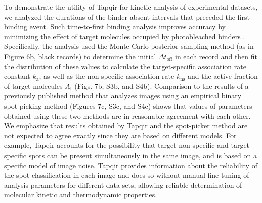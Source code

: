 To demonstrate the utility of Tapqir for kinetic analysis of experimental datasets, we analyzed the durations of the binder-absent intervals that preceded the first binding event.  Such time-to-first binding analysis improves accuracy by minimizing the effect of target molecules occupied by photobleached binders \cite{Friedman2006-kb}.  Specifically, the analysis used the Monte Carlo posterior sampling method (as in Figure 6b, black records) to determine the initial  $\Delta t_\mathrm{off}$ in each record and then fit the distribution of these values to calculate the target-specific association rate constant $k_\mathrm{a}$, as well as the non-specific association rate $k_\mathrm{ns}$ and the active fraction of target molecules $A_\mathrm{f}$ (Figs. 7b, S3b, and S4b). Comparison to the results of a previously published method that analyzes images using an empirical binary spot-picking method \cite{Friedman2006-kb} (Figures 7c, S3c, and S4c) shows that values of parameters obtained using these two methods are in reasonable agreement with each other. We emphasize that results obtained by Tapqir and the spot-picker method are not expected to agree exactly since they are based on different models.  For example, Tapqir accounts for the possibility that target-non specific and target-specific spots can be present simultaneously in the same image, and is based on a specific model of image noise.  Tapqir provides information about the reliability of the spot classification in each image and does so without manual fine-tuning of analysis parameters for different data sets, allowing reliable determination of molecular kinetic and thermodynamic properties.

